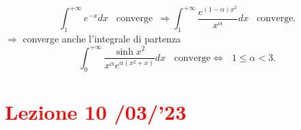 \documentclass{article}
\begin{document}
\begin{itemize}
\begin{itemize}
\begin{equation*}
    \end{equation*}
    \begin{equation*}
          \int_{1}^{+\infty} e^{-x} dx \,\,\,\,\, \text{converge} \,\,\, \Rightarrow \int_{1}^{+\infty} \frac{e^{(1-\alpha)x^2}}{x^\alpha} dx  \,\,\,\,\, \text{converge.} 
    \end{equation*}
    $\Rightarrow$ converge anche l'integrale di partenza
    \begin{equation*}
        \int_{0}^{+\infty} \frac{\sinh{x^2}}{x^\alpha e^{\alpha(x^2+x)}}dx \,\,\,\,\ \text{converge} \Leftrightarrow \,\,\,\, 1\leq \alpha < 3.
    \end{equation*}
    \end{itemize}
\end{itemize}

\newpage
\section{\textcolor{red}{Lezione 10 \space{}/03/'23}}
\end{document}
